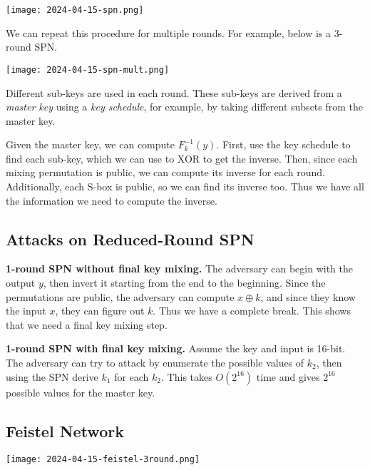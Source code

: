 \begin{center}
    \texttt{[image: 2024-04-15-spn.png]}
\end{center}

We can repeat this procedure for multiple rounds. For example, below is a 3-round SPN.

\begin{center}
    \texttt{[image: 2024-04-15-spn-mult.png]}
\end{center}

Different sub-keys are used in each round. These sub-keys are derived from a \textit{master key} using a \textit{key schedule}, for example, by taking different subsets from the master key.

Given the master key, we can compute $F_{k}^{-1}(y)$. First, use the key schedule to find each sub-key, which we can use to XOR to get the inverse. Then, since each mixing permutation is public, we can compute its inverse for each round. Additionally, each S-box is public, so we can find its inverse too. Thus we have all the information we need to compute the inverse.

\subsection{Attacks on Reduced-Round SPN}

\textbf{1-round SPN without final key mixing.} The adversary can begin with the output $y$, then invert it starting from the end to the beginning. Since the permutations are public, the adversary can compute $x \oplus k$, and since they know the input $x$, they can figure out $k$. Thus we have a complete break. This shows that we need a final key mixing step.

\textbf{1-round SPN with final key mixing.} Assume the key and input is 16-bit. The adversary can try to attack by enumerate the possible values of $k_2$, then using the SPN derive $k_1$ for each $k_2$. This takes $O(2^{16})$ time and gives $2^{16}$ possible values for the master key.

\subsection{Feistel Network}

\begin{center}
    \texttt{[image: 2024-04-15-feistel-3round.png]}
\end{center}

